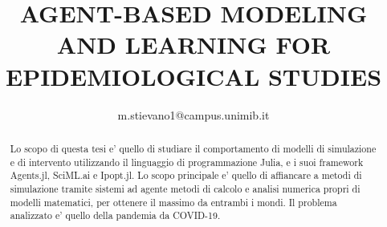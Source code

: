 \documentclass{article}
\title{AGENT-BASED MODELING AND LEARNING FOR EPIDEMIOLOGICAL STUDIES}
\author{m.stievano1@campus.unimib.it}
\begin{document}


\begin{abstract}
    Lo scopo di questa tesi e' quello di studiare il comportamento di modelli di simulazione
    e di intervento utilizzando il linguaggio di programmazione Julia, e i suoi framework
    Agents.jl, SciML.ai e Ipopt.jl. Lo scopo principale e' quello di affiancare a metodi di 
    simulazione tramite sistemi ad agente metodi di calcolo e analisi numerica propri di modelli 
    matematici, per ottenere il massimo da entrambi i mondi. Il problema analizzato e' quello della
    pandemia da COVID-19.
\end{abstract}



\tableofcontents
\newpage
\listoffigures
\newpage
\listoftables
\newpage















% 

\nocite{*}

% 
% 


\end{document}
